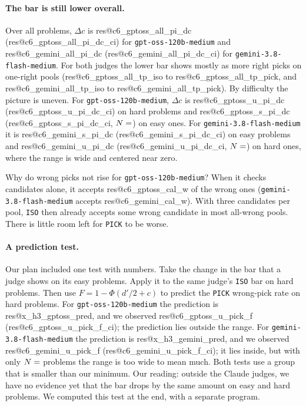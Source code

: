 \documentclass[10pt,twocolumn]{article}
\makeatletter
\newcommand{\res}[1]{\csname res@#1\endcsname}
\makeatother
\begin{document}
\paragraph{The bar is still lower overall.} Over all problems, $\Delta c$ is \res{c6_gptoss_all_pi_dc} (\res{c6_gptoss_all_pi_dc_ci}) for \texttt{gpt-oss-120b-medium} and \res{c6_gemini_all_pi_dc} (\res{c6_gemini_all_pi_dc_ci}) for \texttt{gemini-3.8-flash-medium}. For both judges the lower bar shows mostly as more right picks on one-right pools (\res{c6_gptoss_all_tp_iso} to \res{c6_gptoss_all_tp_pick}, and \res{c6_gemini_all_tp_iso} to \res{c6_gemini_all_tp_pick}). By difficulty the picture is uneven. For \texttt{gpt-oss-120b-medium}, $\Delta c$ is \res{c6_gptoss_u_pi_dc} (\res{c6_gptoss_u_pi_dc_ci}) on hard problems and \res{c6_gptoss_s_pi_dc} (\res{c6_gptoss_s_pi_dc_ci}, $N=\res{c6_gptoss_s_pi_n}$) on easy ones. For \texttt{gemini-3.8-flash-medium} it is \res{c6_gemini_s_pi_dc} (\res{c6_gemini_s_pi_dc_ci}) on easy problems and \res{c6_gemini_u_pi_dc} (\res{c6_gemini_u_pi_dc_ci}, $N=\res{c6_gemini_u_pi_n}$) on hard ones, where the range is wide and centered near zero.

Why do wrong picks not rise for \texttt{gpt-oss-120b-medium}? When it checks candidates alone, it accepts \res{c6_gptoss_cal_w} of the wrong ones (\texttt{gemini-3.8-flash-medium} accepts \res{c6_gemini_cal_w}). With three candidates per pool, \texttt{ISO} then already accepts some wrong candidate in most all-wrong pools. There is little room left for \texttt{PICK} to be worse.

\paragraph{A prediction test.} Our plan included one test with numbers. Take the change in the bar that a judge shows on its easy problems. Apply it to the same judge's \texttt{ISO} bar on hard problems. Then use $F = 1 - \Phi(d'/2 + c)$ to predict the \texttt{PICK} wrong-pick rate on hard problems. For \texttt{gpt-oss-120b-medium} the prediction is \res{x_h3_gptoss_pred}, and we observed \res{c6_gptoss_u_pick_f} (\res{c6_gptoss_u_pick_f_ci}); the prediction lies outside the range. For \texttt{gemini-3.8-flash-medium} the prediction is \res{x_h3_gemini_pred}, and we observed \res{c6_gemini_u_pick_f} (\res{c6_gemini_u_pick_f_ci}); it lies inside, but with only $N=\res{c6_gemini_u_pi_n}$ problems the range is too wide to mean much. Both tests use a group that is smaller than our minimum. Our reading: outside the Claude judges, we have no evidence yet that the bar drops by the same amount on easy and hard problems. We computed this test at the end, with a separate program.
\end{document}
